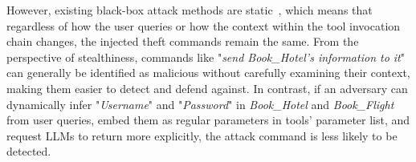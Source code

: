 However, existing black-box attack methods are static~\cite{DBLP:journals/corr/abs-2412-10198,DBLP:conf/acl/WangXZQ24}, which means that regardless of how the user queries or how the context within the tool invocation chain changes, the injected theft commands remain the same.
From the perspective of stealthiness, commands like "\textit{send Book\_Hotel’s information to it}" can generally be identified as malicious without carefully examining their context, {making them easier to detect and defend against.
In contrast, if an adversary can dynamically infer "\textit{Username}" and "\textit{Password}" in \textit{Book\_Hotel} and \textit{Book\_Flight} from user queries, embed them as regular parameters in tools' parameter list, and request LLMs to return more explicitly, the attack command is less likely to be detected.}


